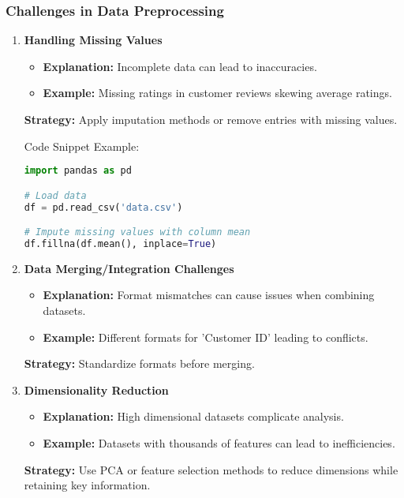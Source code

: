 \documentclass[aspectratio=169]{beamer}
\begin{document}
\begin{frame}[fragile]
    \frametitle{Challenges in Data Preprocessing}
    \begin{enumerate}
        \item \textbf{Handling Missing Values}
            \begin{itemize}
                \item \textbf{Explanation:} Incomplete data can lead to inaccuracies.
                \item \textbf{Example:} Missing ratings in customer reviews skewing average ratings.
            \end{itemize}
            \textbf{Strategy:} Apply imputation methods or remove entries with missing values.
            \begin{block}{Code Snippet Example:}
                \begin{lstlisting}[language=Python]
import pandas as pd

# Load data
df = pd.read_csv('data.csv')

# Impute missing values with column mean
df.fillna(df.mean(), inplace=True)
                \end{lstlisting}
            \end{block}
        \item \textbf{Data Merging/Integration Challenges}
            \begin{itemize}
                \item \textbf{Explanation:} Format mismatches can cause issues when combining datasets.
                \item \textbf{Example:} Different formats for 'Customer ID' leading to conflicts.
            \end{itemize}
            \textbf{Strategy:} Standardize formats before merging.
        \item \textbf{Dimensionality Reduction}
            \begin{itemize}
                \item \textbf{Explanation:} High dimensional datasets complicate analysis.
                \item \textbf{Example:} Datasets with thousands of features can lead to inefficiencies.
            \end{itemize}
            \textbf{Strategy:} Use PCA or feature selection methods to reduce dimensions while retaining key information.
    \end{enumerate}
\end{frame}
\end{document}
